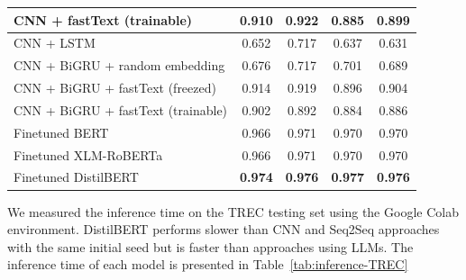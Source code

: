 \documentclass[sn-mathphys,Numbered]{sn-jnl}%
\theoremstyle{thmstyleone}%
\theoremstyle{thmstyletwo}%
\theoremstyle{thmstylethree}%
\begin{document}
\begin{table}
\begin{tabular*}{\textwidth}{@{\extracolsep\fill}lcccc}
CNN + fastText (trainable)                         & 0.910                                 & 0.922                                          & 0.885                                       & 0.899                                         \\
\midrule
CNN + LSTM                           & 0.652                                 & 0.717                                          & 0.637                                       & 0.631                                         \\
CNN + BiGRU + random embedding     & 0.676                                 & 0.717                                          & 0.701                                       & 0.689                                         \\
CNN + BiGRU + fastText (freezed)   & 0.914                                 & 0.919                                          & 0.896                                       & 0.904                                         \\
CNN + BiGRU + fastText (trainable) & 0.902                                 & 0.892                                          & 0.884                                       & 0.886                                         \\ \midrule
Finetuned BERT                                 & 0.966                                 & 0.971                                          & 0.970                                       & 0.970                                         \\
Finetuned XLM-RoBERTa                                 & 0.966                                 & 0.971                                          & 0.970                                       & 0.970                                         \\ \midrule
Finetuned DistilBERT                                  & \textbf{0.974}                        & \textbf{0.976}                                 & \textbf{0.977}                              & \textbf{0.976}                                \\ \bottomrule
\end{tabular*}
\end{table}

We measured the inference time on the TREC testing set using the Google Colab environment. DistilBERT performs slower than CNN and Seq2Seq approaches with the same initial seed but is faster than approaches using LLMs. The inference time of each model is presented in Table~\ref{tab:inference-TREC}
\end{document}
